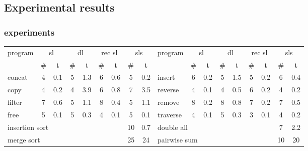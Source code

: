 \documentclass{beamer}
\begin{document}
\subsection{Experimental results}

\begin{frame}
  \frametitle{experiments}
\begin{table}[t]%
{\tiny
\centering
\renewcommand{\tabcolsep}{0.14cm}
\begin{tabular}{|l|c|c|c|c|c|c|c|c||l|c|c|c|c|c|c|c|c|}
\hline
program & \multicolumn{2}{|c|}{sl} & \multicolumn{2}{|c|}{dl} & \multicolumn{2}{|c|}{rec sl} & \multicolumn{2}{|c||}{sls} & 

program & \multicolumn{2}{|c|}{sl}  & \multicolumn{2}{|c|}{dl} & \multicolumn{2}{|c|}{rec sl} & \multicolumn{2}{|c|}{sls}
\\

\cline{2-9}
\cline{11-18}

& \# & t & \# & t & \# & t & \# & t &
& \# & t & \# & t & \# & t & \# & t \\

\hline

concat & 4 & 0.1 & 5 & 1.3 & 6 & 0.6 & 5 & 0.2 & 
insert & 6 & 0.2 & 5 & 1.5 & 5 & 0.2 & 6 & 0.4 \\


copy    & 4 & 0.2 & 4 & 3.9 & 6 & 0.8 & 7 & 3.5 & 
reverse & 4 & 0.1 & 4 & 0.5 & 6 & 0.2 & 4 & 0.2 \\


filter & 7 & 0.6 & 5 & 1.1 & 8 & 0.4 & 5 & 1.1 & 
remove & 8 & 0.2 & 8 & 0.8 & 7 & 0.2 & 7 & 0.5 \\


free     & 5 & 0.1 & 5 & 0.3 & 4 & 0.1 & 5 & 0.1 & 
traverse & 4 & 0.1 & 5 & 0.3 & 3 & 0.1 & 4 & 0.2 \\

\cline{2-7}
\cline{11-16}


\multicolumn{7}{|l|}{insertion sort} & 10 & 0.7 &
\multicolumn{7}{|l|}{double all} & 7 & 2.2\\

\multicolumn{7}{|l|}{merge sort} & 25 & 24 &
\multicolumn{7}{|l|}{pairwise sum} & 10 & 20 \\
\hline
\end{tabular}
}
\end{table}


\end{frame}
\end{document}
